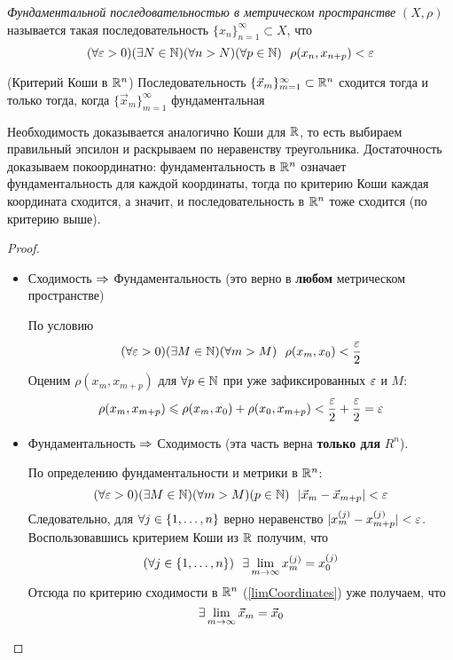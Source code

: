 \begin{definition}
	\textit{Фундаментальной последовательностью в
	метрическом пространстве} $(X, \rho)$
	называется такая последовательность
	$\{x_n\}_{n = 1}^\infty \subset X$, что
	\[
		(\forall \eps > 0)(\exists N \in \N)
		(\forall n > N)(\forall p \in \N)\ \ 
		\rho(x_n, x_{n + p}) < \eps
	\]
\end{definition}

\begin{theorem} (Критерий Коши в $\mathbb{R}^n$)
	Последовательность
	$\{\vec{x}_m\}_{m = 1}^\infty \subset \mathbb{R}^n$ сходится
	тогда и только тогда, когда
	$\{\vec{x}_m\}_{m = 1}^\infty$ фундаментальная
\end{theorem}

\begin{idea}
	Необходимость доказывается аналогично Коши для $\mathbb{R}$, то
	есть выбираем правильный эпсилон и раскрываем по неравенству
	треугольника. Достаточность доказываем покоординатно:
	фундаментальность в $\mathbb{R}^n$ означает
	фундаментальность для каждой координаты, тогда
	по критерию Коши каждая координата сходится,
	а значит, и последовательность в $\mathbb{R}^n$ тоже 
	сходится (по критерию выше).
\end{idea}

\begin{proof}~
	\begin{itemize}
		\item Сходимость $\Rightarrow$ Фундаментальность 
			(это верно в \textbf{любом} метрическом
			пространстве)
			
			По условию
			\[
				(\forall \varepsilon > 0)(\exists M \in \mathbb{N})(\forall m > M)
				\ \ \rho(x_m, x_0) < \frac{\varepsilon}{2}
			\]
			Оценим $\rho(x_m, x_{m + p})$ для
			$\forall p \in \mathbb{N}$ при уже зафиксированных
			$\varepsilon$ и $M$:
			\[
				\rho(x_m, x_{m + p}) \leqslant \rho(x_m, x_0) +
				\rho(x_0, x_{m + p}) < \frac{\varepsilon}{2} +
				\frac{\varepsilon}{2} = \varepsilon
			\]
			
		\item Фундаментальность $\Rightarrow$ Сходимость
			(эта часть верна \textbf{только для} $R^n$).
			
			По определению фундаментальности и метрики в $\mathbb{R}^n$:
			\[
				(\forall \eps > 0)(\exists M \in \N)
				(\forall m > M)(p \in \N)\ \ 
				|\vec{x}_m - \vec{x}_{m + p}| < \eps
			\]
			Следовательно, для $\forall j \in \{1, \ldots, n\}$
			верно неравенство $|x_m^{(j)} - x_{m + p}^{(j)}| < \varepsilon$.
			Воспользовавшись критерием Коши из $\mathbb{R}$ получим, что
			\[
				(\forall j \in \range{n})\ \ 
				\exists \liml_{m \to \infty} x_m^{(j)} = x_0^{(j)}
			\]
			Отсюда по критерию сходимости в $\mathbb{R}^n$ (\ref{limCoordinates})
			уже получаем, что
			\[
				\exists \lim\limits_{m \to \infty} \vec{x}_m = \vec{x}_0
			\]
	\end{itemize}
\end{proof}

